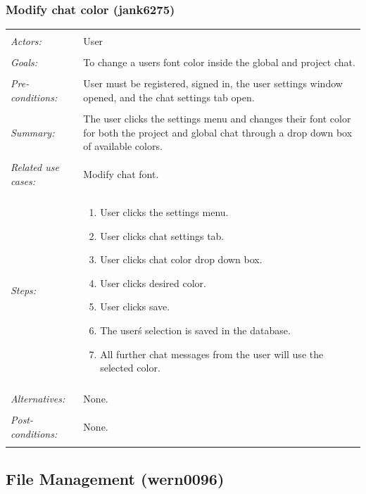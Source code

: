 \documentclass[11pt]{report}
\begin{document}
\subsubsection{Modify chat color (jank6275)}
\begin{tabular}{ p{2cm} p{12cm} }
 \hline
 \\
 \textit{Actors:} & User \\ 
 \\
 \textit{Goals:} & To change a users font color inside the global and project chat. \\
 \\
 \textit{Pre-conditions:} & User must be registered, signed in, the user settings window opened, and the chat settings tab open.  \\
 \\
 \textit{Summary:} & The user clicks the settings menu and changes their font color for both the project and global chat through a drop down box of available colors. \\ 
 \\
 \textit{Related use cases:} & Modify chat font. \\ 
 \\
 \textit{Steps:} & \begin{enumerate}
  \item User clicks the settings menu.
  \item User clicks chat settings tab.
  \item User clicks chat color drop down box.
  \item User clicks desired color.
  \item User clicks save.
  \item The user\'s selection is saved in the database.
  \item All further chat messages from the user will use the selected color.
 \end{enumerate} \\
 \\
 \textit{Alternatives:} & None. \\
 \\
 \textit{Post-conditions:} & None. \\
 \\
\hline
\end{tabular}



\newpage

\subsection{File Management (wern0096)}
\end{document}
